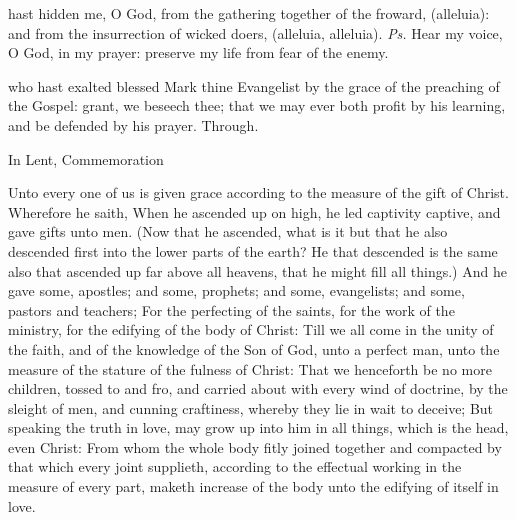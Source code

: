 
\introit
{} hast hidden me, O God, from the gathering together of the froward, (alleluia): and from the insurrection of wicked doers, (alleluia, alleluia). \textit{Ps.} Hear my voice, O God, in my prayer: preserve my life from fear of the enemy.

\collect
 who hast exalted blessed Mark thine Evangelist by the grace of the preaching of the Gospel: grant, we beseech thee; that we may ever both profit by his learning, and be defended by his prayer. Through.
\begin{rubric}
    In Lent, Commemoration %
\end{rubric}

 Unto every one of us is given grace according to the measure of the gift of Christ. Wherefore he saith, When he ascended up on high, he led captivity captive, and gave gifts unto men. (Now that he ascended, what is it but that he also descended first into the lower parts of the earth? He that descended is the same also that ascended up far above all heavens, that he might fill all things.) And he gave some, apostles; and some, prophets; and some, evangelists; and some, pastors and teachers; For the perfecting of the saints, for the work of the ministry, for the edifying of the body of Christ: Till we all come in the unity of the faith, and of the knowledge of the Son of God, unto a perfect man, unto the measure of the stature of the fulness of Christ: That we henceforth be no more children, tossed to and fro, and carried about with every wind of doctrine, by the sleight of men, and cunning craftiness, whereby they lie in wait to deceive; But speaking the truth in love, may grow up into him in all things, which is the head, even Christ: From whom the whole body fitly joined together and compacted by that which every joint supplieth, according to the effectual working in the measure of every part, maketh increase of the body unto the edifying of itself in love.


